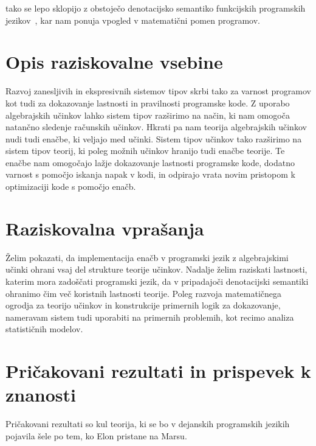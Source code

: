 \documentclass{article}
\begin{document}
tako se lepo sklopijo z obstoječo denotacijsko semantiko funkcijskih programskih jezikov~\cite{DBLP:journals/corr/BauerP13}, kar nam ponuja vpogled v matematični pomen programov. 

\section*{Opis raziskovalne vsebine}

Razvoj zanesljivih in ekspresivnih sistemov tipov skrbi tako za varnost programov kot tudi za dokazovanje lastnosti in pravilnosti programske kode. Z uporabo algebrajskih učinkov lahko sistem tipov razširimo na način, ki nam omogoča natančno sledenje računskih učinkov. Hkrati pa nam teorija algebrajskih učinkov nudi tudi enačbe, ki veljajo med učinki. Sistem tipov učinkov tako razširimo na sistem tipov teorij, ki poleg možnih učinkov hranijo tudi enačbe teorije. Te enačbe nam omogočajo lažje dokazovanje lastnosti programske kode, dodatno varnost s pomočjo iskanja napak v kodi, in odpirajo vrata novim pristopom k optimizaciji kode s pomočjo enačb.

\section*{Raziskovalna vprašanja}

Želim pokazati, da implementacija enačb v programski jezik z algebrajskimi učinki ohrani vsaj del strukture teorije učinkov. Nadalje želim raziskati lastnosti, katerim mora zadoščati programski jezik, da v pripadajoči denotacijski semantiki ohranimo čim več koristnih lastnosti teorije. Poleg razvoja matematičnega ogrodja za teorijo učinkov in konstrukcije primernih logik za dokazovanje, nameravam sistem tudi uporabiti na primernih problemih, kot recimo analiza statističnih modelov.

\section*{Pričakovani rezultati in prispevek k znanosti}

Pričakovani rezultati so kul teorija, ki se bo v dejanskih programskih jezikih pojavila šele po tem, ko Elon pristane na Marsu.

\renewcommand\refname{Literatura}


\end{document}

